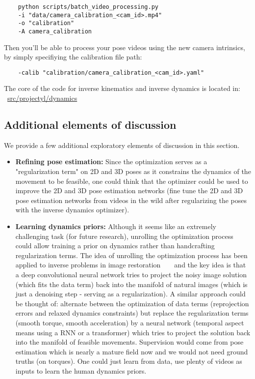 \begin{verbatim}
    python scripts/batch_video_processing.py
    -i "data/camera_calibration_<cam_id>.mp4"
    -o "calibration"
    -A camera_calibration
\end{verbatim}

Then you'll be able to process your pose videos using the new camera intrinsics, by simply specifiying
the calibration file path:
\begin{verbatim}
    -calib "calibration/camera_calibration_<cam_id>.yaml"
\end{verbatim}

The core of the code for inverse kinematics and inverse dynamics is located in:
~\href{https://github.com/balthazarneveu/monocular_pose_and_forces_estimation/tree/main/src/projectyl/dynamics}{src/projectyl/dynamics}


\subsection{Additional elements of discussion}
\label{app:additional_discussion}
We provide a few additional exploratory elements of discussion in this section.
\begin{itemize}
\item \textbf{Refining pose estimation: } Since the optimization serves as a "regularization term" on 2D and 3D poses as it constrains the dynamics of the movement to be feasible,
one could think that the optimizer could be used to improve the 2D and 3D pose estimation networks (fine tune the 2D and 3D pose estimation networks from videos in the wild
after regularizing the poses with the inverse dynamics optimizer).

\item \textbf{Learning dynamics priors:}  Although it seems like an extremely challenging task (for future research), unrolling the optimization process could allow 
training a prior on dynamics rather than handcrafting regularization terms. The idea of unrolling the optimization process has been applied
to inverse problems in image restoration ~\cite{lecouat2021lucaskanade} ~\cite{Venkatakrishnan20135292013PP} and
the key idea is that a deep convolutional neural network tries to project the noisy image solution (which fits the data term) back into the manifold of natural images (which is just a denoising step - serving as a regularization).
A similar approach could be thought of: alternate between the optimization of data terms (reprojection errors and relaxed dynamics constraints) 
but replace the regularization terms (smooth torque, smooth acceleration) by a neural network (temporal aspect means using a RNN or a transformer) which tries to project 
the solution back into the manifold of feasible movements. Supervision would come from pose estimation which is nearly a mature field now and we would not need ground truths (on torques).
One could just learn from data, use plenty of videos as inputs to learn the human dynamics priors.
\end{itemize}